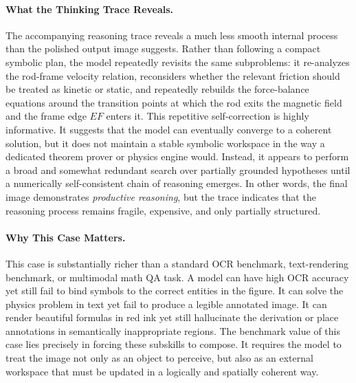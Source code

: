 \documentclass{llmxive}
\begin{document}
\paragraph{What the Thinking Trace Reveals.}
The accompanying reasoning trace reveals a much less smooth internal process than the polished output image suggests. Rather than following a compact symbolic plan, the model repeatedly revisits the same subproblems: it re-analyzes the rod-frame velocity relation, reconsiders whether the relevant friction should be treated as kinetic or static, and repeatedly rebuilds the force-balance equations around the transition points at which the rod exits the magnetic field and the frame edge $EF$ enters it. This repetitive self-correction is highly informative. It suggests that the model can eventually converge to a coherent solution, but it does not maintain a stable symbolic workspace in the way a dedicated theorem prover or physics engine would. Instead, it appears to perform a broad and somewhat redundant search over partially grounded hypotheses until a numerically self-consistent chain of reasoning emerges. In other words, the final image demonstrates \emph{productive reasoning}, but the trace indicates that the reasoning process remains fragile, expensive, and only partially structured.

\paragraph{Why This Case Matters.}
This case is substantially richer than a standard OCR benchmark, text-rendering benchmark, or multimodal math QA task. A model can have high OCR accuracy yet still fail to bind symbols to the correct entities in the figure. It can solve the physics problem in text yet fail to produce a legible annotated image. It can render beautiful formulas in red ink yet still hallucinate the derivation or place annotations in semantically inappropriate regions. The benchmark value of this case lies precisely in forcing these subskills to compose. It requires the model to treat the image not only as an object to perceive, but also as an external workspace that must be updated in a logically and spatially coherent way.
\end{document}
